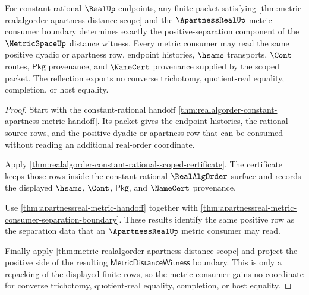 \begin{theorem}
\label{thm:metric-realalgorder-apartness-positive-reflection}
For constant-rational $\RealUp$ endpoints, any finite packet satisfying
\autoref{thm:metric-realalgorder-apartness-distance-scope} and the
$\ApartnessRealUp$ metric consumer boundary determines exactly the
positive-separation component of the $\MetricSpaceUp$ distance witness. Every
metric consumer may read the same positive dyadic or apartness row, endpoint
histories, $\hsame$ transports, $\Cont$ routes, $\mathsf{Pkg}$ provenance, and
$\NameCert$ provenance supplied by the scoped packet. The reflection exports no
converse trichotomy, quotient-real equality, completion, or host equality.
\end{theorem}
\begin{proof}
Start with the constant-rational handoff
\autoref{thm:realalgorder-constant-apartness-metric-handoff}. Its packet gives
the endpoint histories, the rational source rows, and the positive dyadic or
apartness row that can be consumed without reading an additional real-order
coordinate.

Apply \autoref{thm:realalgorder-constant-rational-scoped-certificate}. The
certificate keeps those rows inside the constant-rational $\RealAlgOrder$
surface and records the displayed $\hsame$, $\Cont$, $\mathsf{Pkg}$, and
$\NameCert$ provenance.

Use \autoref{thm:apartnessreal-metric-handoff} together with
\autoref{thm:apartnessreal-metric-consumer-separation-boundary}. These results
identify the same positive row as the separation data that an
$\ApartnessRealUp$ metric consumer may read.

Finally apply
\autoref{thm:metric-realalgorder-apartness-distance-scope} and project the
positive side of the resulting $\mathsf{MetricDistanceWitness}$ boundary. This
is only a repacking of the displayed finite rows, so the metric consumer gains
no coordinate for converse trichotomy, quotient-real equality, completion, or
host equality.
\end{proof}

